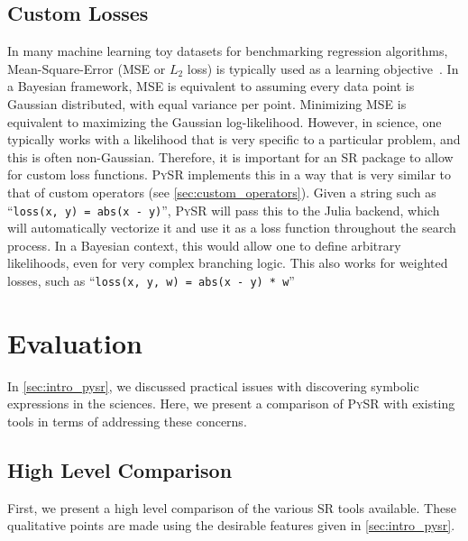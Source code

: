 \documentclass[letterpaper,twocolumn]{scrartcl}
\newcommand\pysr{\textsc{PySR}\xspace}
\begin{document}
\begin{linenumbers}
\subsection{Custom Losses}
\label{sec:custom_losses}

In many machine learning toy datasets for benchmarking regression algorithms, Mean-Square-Error (MSE or $L_2$ loss) is typically used as a learning objective~\cite{grinsztajnWhyTreebasedModels2022}.
In a Bayesian framework, MSE is equivalent to assuming every data point is Gaussian distributed, with equal variance per point.
Minimizing MSE is equivalent to maximizing the Gaussian log-likelihood.
However, in science, one typically works with 
a likelihood that is very specific to a particular problem,
and this is often non-Gaussian.
Therefore, it is important for an SR package to allow for custom loss functions.
\pysr implements this in a way that is very similar to that of custom operators (see \cref{sec:custom_operators}).
Given a string such as ``\texttt{loss(x, y) = abs(x - y)}'', \pysr will pass this to the Julia backend, which will automatically vectorize it and use it as a loss function throughout the search process.
In a Bayesian context, this would allow one to define arbitrary likelihoods, even for very complex branching logic.
This also works for weighted losses, such as ``\texttt{loss(x, y, w) = abs(x - y) * w}''


\section{Evaluation}
\label{sec:evaluation}



In \cref{sec:intro_pysr}, we discussed practical issues with discovering symbolic expressions in the sciences.
Here, we present a comparison of \pysr with existing tools in terms of addressing these concerns.


\subsection{High Level Comparison}

First, we present a high level comparison of the various SR tools available.
These qualitative points are made using the desirable features given in \cref{sec:intro_pysr}.



\end{linenumbers}
\end{document}
